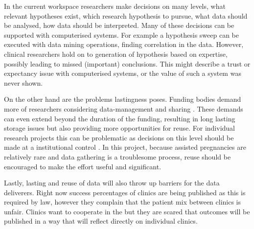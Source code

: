 In the current workspace researchers make decisions on many levels, \eg{} what relevant hypotheses exist, which research hypothesis to pursue, what data should be analysed, how data should be interpreted.
Many of these decisions can be supported with computerised systems.
For example a hypothesis sweep can be executed with data mining operations, finding correlation in the data.
However, clinical researchers hold on to generation of hypothesis based on expertise, possibly leading to missed (important) conclusions.
This might describe a trust or expectancy issue with computerised systems, or the value of such a system was never shown.

On the other hand are the problems lastingness poses.
Funding bodies demand more of researchers considering data-management and sharing \cite{dsb3lynch}.
These demands can even extend beyond the duration of the funding, resulting in long lasting storage issues but also providing more opportunities for reuse.
For individual research projects this can be problematic as decisions on this level should be made at a institutional control \cite{dsb3lynch}.
In this project, because assisted pregnancies are relatively rare and data gathering is a troublesome process, reuse should be encouraged to make the effort useful and significant.

Lastly, lasting and reuse of data will also throw up barriers for the data deliverers.
Right now success percentages of clinics are being published as this is required by law, however they complain that the patient mix between clinics is unfair.
Clinics want to cooperate in the \project{} but they are scared that outcomes will be published in a way that will reflect directly on individual clinics.


